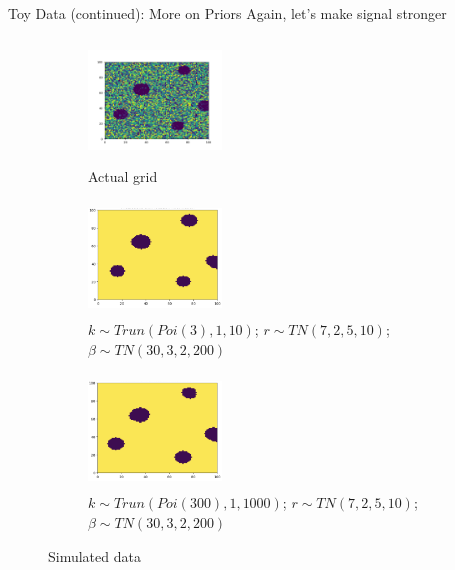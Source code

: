 \documentclass[10pt,mathserif]{beamer}
\begin{document}
\begin{frame}{Toy Data (continued): More on Priors}
Again, let's make signal stronger
\begin{figure}[t!]
    \centering
    \begin{subfigure}[t]{0.3\textwidth}
        \centering
        \includegraphics[height=1.3in, width=1.4in]{../BDC_gridactual}
        \caption{Actual grid}
    \end{subfigure}%
    \begin{subfigure}[t]{0.3\textwidth}
        \centering
        \includegraphics[height=1.2in, width=1.4in]{../BDC_grid7_c3_ss}
        \caption{ $k \sim Trun(Poi(3), 1, 10)$; $r \sim TN(7, 2, 5, 10)$; $\beta \sim TN(30, 3, 2, 200)$}
    \end{subfigure}%
        \begin{subfigure}[t]{0.3\textwidth}
        \centering
        \includegraphics[height=1.2in, width=1.4in]{../BDC_grid8_c300_ss}
        \caption{ $k \sim Trun(Poi(300), 1, 1000)$; $r \sim TN(7, 2, 5, 10)$; $\beta \sim TN(30, 3, 2, 200)$}
    \end{subfigure}
    \caption{Simulated data}
\end{figure}
\end{frame}
\end{document}
